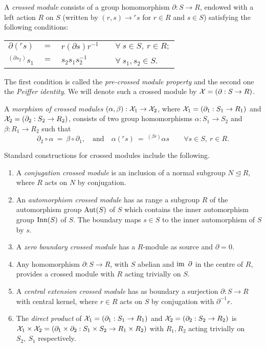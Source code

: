\documentclass[a4paper,11pt]{article}
\theoremstyle{plain}
\theoremstyle{definition}
\begin{document}
A \emph{crossed module} consists of a group homomorphism 
$\partial : S \rightarrow R$, endowed with a left action $R$ on $S$ 
(written by $(r,s) \rightarrow {}^{r}s$ for $r \in R$ and $s \in S$) 
satisfying the following conditions:

\begin{center}
	\begin{tabular}{rclll}
	$\partial (^{r}s)$ 
		& $=$ 
			& $r(\partial s)r^{-1}$ 
				&   & $\forall~ s \in S,~ r \in R; $ \\
	$^{(\partial s_{2})}s_{1}$ 
		& $=$ 
			& $s_{2}s_{1}s_{2}^{-1}$ 
				&   & $\forall~ s_{1},s_{2} \in S$. 
	\end{tabular}
\end{center}

The first condition is called the \emph{pre-crossed module property} 
and the second one the \emph{Peiffer identity}. 
We will denote such a crossed module by $\mathcal{X} = (\partial : S \rightarrow R)$.

A \emph{morphism of crossed modules} 
$(\alpha ,\beta ) : \mathcal{X}_{1} \rightarrow \mathcal{X}_{2}$, 
where $\mathcal{X}_{1} = (\partial_{1} : S_{1} \rightarrow R_{1})$ 
and   $\mathcal{X}_{2} = (\partial_{2} : S_{2} \rightarrow R_{2})$, 
consists of two group homomorphisms $\alpha : S_{1} \rightarrow S_{2}$
and $\beta : R_{1} \rightarrow R_{2}$ such that 
$$ 
\partial_{2}\circ\alpha ~=~ \beta\circ\partial_{1}, 
\quad \mbox{and} \quad 
\alpha(^{r}s) ~=~ ^{(\beta r)}\alpha s 
\qquad
\forall s \in S,~ r \in R.
$$

Standard constructions for crossed modules include the following. 
\begin{enumerate}
\item 
A \emph{conjugation crossed module}  
is an inclusion of a normal subgroup $N \unlhd R$, 
where $R$ acts on $N$ by conjugation.
\item 
An \emph{automorphism crossed module}  
has as range a subgroup $R$ of the automorphism group $\mathrm{Aut}(S)$ of $S$ 
which contains the inner automorphism group $\mathrm{Inn}(S)$ of $S$. 
The boundary maps $s \in S$ to the inner automorphism of $S$ by $s$.
\item 
A \emph{zero boundary crossed module}  
has a $R$-module as source and $\partial = 0$.
\item 
Any homomorphism $\partial : S \to R$, with $S$ abelian 
and $\mathrm{im}\, ~\partial$ in the centre of $R$, 
provides a crossed module with $R$ acting trivially on $S$.
\item 
A \emph{central extension crossed module} 
has as boundary a surjection $\partial : S \to R$ with central kernel, 
where $r \in R$ acts on $S$ by conjugation with $\partial^{-1}r$.
\item 
The \emph{direct product} of  
$\mathcal{X}_1 = (\partial_1 : S_1 \to R_1)$ and $\mathcal{X}_2 = (\partial_2 : S_2 \to R_2)$ 
is $\mathcal{X}_1 \times \mathcal{X}_2 
= (\partial_1 \times \partial_2 : S_1 \times S_2 \to R_1 \times R_2)$ 
with $R_1, R_2$ acting trivially on $S_2,\ S_1$ respectively.
\end{enumerate}
\end{document}
